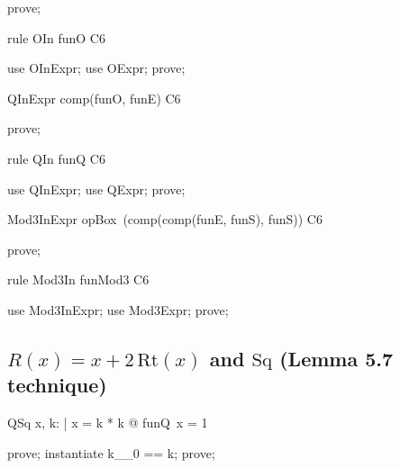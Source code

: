 \documentclass{article}
\begin{document}
\begin{zproof}
prove;
\end{zproof}

\begin{theorem}{rule OIn}
  funO \in C6
\end{theorem}

\begin{zproof}
use OInExpr;
use OExpr;
prove;
\end{zproof}

\begin{theorem}{QInExpr}
  comp(funO, funE) \in C6
\end{theorem}

\begin{zproof}
prove;
\end{zproof}

\begin{theorem}{rule QIn}
  funQ \in C6
\end{theorem}

\begin{zproof}
use QInExpr;
use QExpr;
prove;
\end{zproof}

\begin{theorem}{Mod3InExpr}
  opBox~(comp(comp(funE, funS), funS)) \in C6
\end{theorem}

\begin{zproof}
prove;
\end{zproof}

\begin{theorem}{rule Mod3In}
  funMod3 \in C6
\end{theorem}

\begin{zproof}
use Mod3InExpr;
use Mod3Expr;
prove;
\end{zproof}

\subsection{$R(x) = x + 2\,\mathrm{Rt}(x)$ and $\mathrm{Sq}$ (Lemma 5.7 technique)}

\begin{theorem}{QSq}
  \forall x, k: \nat | x = k * k @ funQ~x = 1
\end{theorem}

\begin{zproof}
prove;
instantiate k\_\_0 == k;
prove;
\end{zproof}
\end{document}
